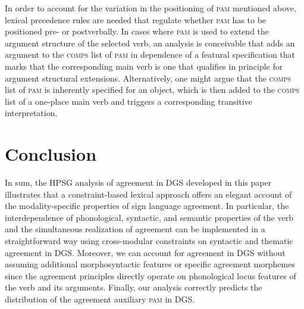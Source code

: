 \documentclass[11pt,a4paper,fleqn]{article}
\begin{document}
\begin{exe}
\ex  \label{ex:personal}
\end{exe}

In order to account for the variation in the positioning of \textsc{pam} mentioned above, lexical precedence rules are needed that regulate whether \textsc{pam} has to be positioned pre- or postverbally. In cases where \textsc{pam} is used to extend the argument structure of the selected verb, an analysis is conceivable that adds an argument to the \textsc{comps} list of \textsc{pam} in dependence of a featural specification that marks that the corresponding main verb is one that qualifies in principle for argument structural extensions. Alternatively, one might argue that the \textsc{comps} list of \textsc{pam} is inherently specified for an object, which is then added to the \textsc{comps} list of a one-place main verb and triggers a corresponding transitive interpretation.


\section{Conclusion}

In sum, the HPSG analysis of agreement in DGS developed in this paper illustrates that a constraint-based lexical approach offers an elegant account of the modality-specific properties of sign language agreement. In particular, the interdependence of phonological, syntactic, and semantic properties of the verb and the simultaneous realization of agreement can be implemented in a straightforward way using cross-modular constraints on syntactic and thematic agreement in DGS. Moreover, we can account for agreement in DGS without assuming additional morphosyntactic features or specific agreement morphemes since the agreement principles directly operate on phonological locus features of the verb and its arguments. Finally, our analysis correctly predicts the distribution of the agreement auxiliary \textsc{pam} in DGS.
\end{document}
